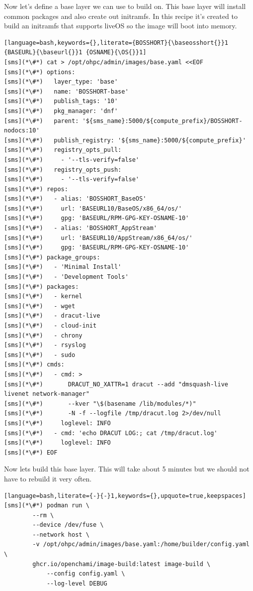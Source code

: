 Now let's define a base layer we can use to build on. This base layer will
install common packages and also create out initramfs. In this recipe it's
created to build an initramfs that supports liveOS so the image will boot into
memory.

\begin{lstlisting}[language=bash,keywords={},literate={BOSSHORT}{\baseosshort{}}1 {BASEURL}{\baseurl{}}1 {OSNAME}{\OS{}}1]
[sms](*\#*) cat > /opt/ohpc/admin/images/base.yaml <<EOF
[sms](*\#*) options:
[sms](*\#*)   layer_type: 'base'
[sms](*\#*)   name: 'BOSSHORT-base'
[sms](*\#*)   publish_tags: '10'
[sms](*\#*)   pkg_manager: 'dnf'
[sms](*\#*)   parent: '${sms_name}:5000/${compute_prefix}/BOSSHORT-nodocs:10'
[sms](*\#*)   publish_registry: '${sms_name}:5000/${compute_prefix}'
[sms](*\#*)   registry_opts_pull:
[sms](*\#*)     - '--tls-verify=false'
[sms](*\#*)   registry_opts_push:
[sms](*\#*)     - '--tls-verify=false'
[sms](*\#*) repos:
[sms](*\#*)   - alias: 'BOSSHORT_BaseOS'
[sms](*\#*)     url: 'BASEURL10/BaseOS/x86_64/os/'
[sms](*\#*)     gpg: 'BASEURL/RPM-GPG-KEY-OSNAME-10'
[sms](*\#*)   - alias: 'BOSSHORT_AppStream'
[sms](*\#*)     url: 'BASEURL10/AppStream/x86_64/os/'
[sms](*\#*)     gpg: 'BASEURL/RPM-GPG-KEY-OSNAME-10'
[sms](*\#*) package_groups:
[sms](*\#*)   - 'Minimal Install'
[sms](*\#*)   - 'Development Tools'
[sms](*\#*) packages:
[sms](*\#*)   - kernel
[sms](*\#*)   - wget
[sms](*\#*)   - dracut-live
[sms](*\#*)   - cloud-init
[sms](*\#*)   - chrony
[sms](*\#*)   - rsyslog
[sms](*\#*)   - sudo
[sms](*\#*) cmds:
[sms](*\#*)   - cmd: >
[sms](*\#*)       DRACUT_NO_XATTR=1 dracut --add "dmsquash-live livenet network-manager"
[sms](*\#*)       --kver "\$(basename /lib/modules/*)"
[sms](*\#*)       -N -f --logfile /tmp/dracut.log 2>/dev/null
[sms](*\#*)     loglevel: INFO
[sms](*\#*)   - cmd: 'echo DRACUT LOG:; cat /tmp/dracut.log'
[sms](*\#*)     loglevel: INFO
[sms](*\#*) EOF
\end{lstlisting}

Now lets build this base layer. This will take about 5 minutes but we should
not have to rebuild it very often.

\begin{lstlisting}[language=bash,literate={-}{-}1,keywords={},upquote=true,keepspaces]
[sms](*\#*) podman run \
		--rm \
		--device /dev/fuse \
		--network host \
		-v /opt/ohpc/admin/images/base.yaml:/home/builder/config.yaml \
		ghcr.io/openchami/image-build:latest image-build \
			--config config.yaml \
			--log-level DEBUG
\end{lstlisting}

